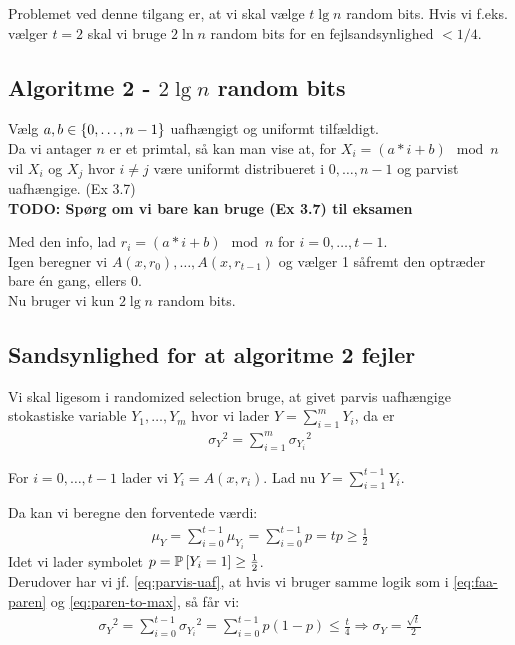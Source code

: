 Problemet ved denne tilgang er, at vi skal vælge $t \lg n$ random bits. Hvis vi f.eks. vælger $t = 2$ skal vi bruge $2 \ln n$ random bits for en fejlsandsynlighed $< 1/4$.

\subsection{Algoritme 2 - $2 \lg n$ random bits}
Vælg $a, b \in \curly{0, \dots, n-1}$ uafhængigt og uniformt tilfældigt.\\

Da vi antager $n$ er et primtal, så kan man vise at, for $X_i = (a * i + b) \mod n$ vil $X_i$ og $X_j$ hvor $i \neq j$ være uniformt distribueret i $0, \dots, n-1$ og parvist uafhængige. (Ex 3.7)\\
\textbf{TODO: Spørg om vi bare kan bruge (Ex 3.7) til eksamen}

Med den info, lad $r_i = (a * i + b) \mod n$ for $i = 0, \dots, t-1$.\\
Igen beregner vi $A(x, r_0), \dots, A(x, r_{t-1})$ og vælger 1 såfremt den optræder bare én gang, ellers 0.\\

Nu bruger vi kun $2 \lg n$ random bits.

\subsection{Sandsynlighed for at algoritme 2 fejler}
Vi skal ligesom i randomized selection bruge, at givet parvis uafhængige stokastiske variable $Y_1, \dots, Y_m$ hvor vi lader $Y = \sum_{i=1}^m Y_i$, da er
\begin{align}
  {\sigma_Y}^2 = \sum_{i=1}^m {\sigma_{Y_i}}^2 \label{eq:parvis-uaf}
\end{align}\vspace{2em}

For $i = 0, \dots, t-1$ lader vi $Y_i = A(x, r_i)$. Lad nu $Y = \sum_{i=1}^{t-1} Y_i$.

Da kan vi beregne den forventede værdi:
\begin{align}
  \mu_Y = \sum_{i=0}^{t-1} \mu_{Y_i} = \sum_{i=0}^{t-1} p = tp \geq \frac{1}{2} \label{eq:mu-y-ulighed}
\end{align}
Idet vi lader symbolet $p = \P{Y_i = 1} \geq \frac{1}{2}$.\\

Derudover har vi jf. \cref{eq:parvis-uaf}, at hvis vi bruger samme logik som i \cref{eq:faa-paren} og \cref{eq:paren-to-max}, så får vi:
\begin{align*}
  {\sigma_Y}^2
  = \sum_{i=0}^{t-1} {\sigma_{Y_i}}^2
  = \sum_{i=0}^{t-1} p(1-p)
  \leq \frac{t}{4} \Longrightarrow \sigma_Y
  = \frac{\sqrt{t}}{2}
\end{align*}

